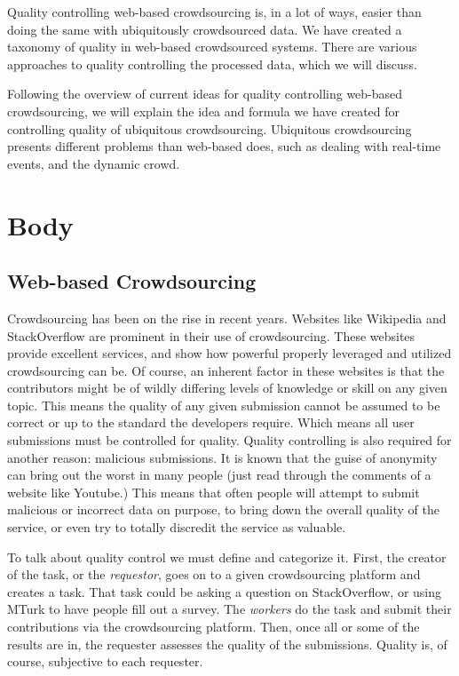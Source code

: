 \documentclass[9pt,twocolumn]{article}
\begin{document}
	Quality controlling web-based crowdsourcing is, in a lot of ways, easier than doing the same with ubiquitously crowdsourced data. We have created a taxonomy of quality in web-based crowdsourced systems. There are various approaches to quality controlling the processed data, which we will discuss.
	
	Following the overview of current ideas for quality controlling web-based crowdsourcing, we will explain the idea and formula we have created for controlling quality of ubiquitous crowdsourcing. Ubiquitous crowdsourcing presents different problems than web-based does, such as dealing with real-time events, and the dynamic crowd. 
	
	\section*{Body}	
	\subsection*{Web-based Crowdsourcing}
		
	Crowdsourcing has been on the rise in recent years. Websites like Wikipedia and StackOverflow are prominent in their use of crowdsourcing. These websites provide excellent services, and show how powerful properly leveraged and utilized crowdsourcing can be. Of course, an inherent factor in these websites is that the contributors might be of wildly differing levels of knowledge or skill on any given topic. This means the quality of any given submission cannot be assumed to be correct or up to the standard the developers require. Which means all user submissions must be controlled for quality. Quality controlling is also required for another reason: malicious submissions. It is known that the guise of anonymity can bring out the worst in many people (just read through the comments of a website like Youtube.) This means that often people will attempt to submit malicious or incorrect data on purpose, to bring down the overall quality of the service, or even try to totally discredit the service as valuable.
	
	To talk about quality control we must define and categorize it. First, the creator of the task, or the \emph{requestor}, goes on to a given crowdsourcing platform and creates a task. That task could be asking a question on StackOverflow, or using MTurk to have people fill out a survey. The \emph{workers} do the task and submit their contributions via the crowdsourcing platform. Then, once all or some of the results are in, the requester assesses the quality of the submissions. Quality is, of course, subjective to each requester. 
	
\end{document}
